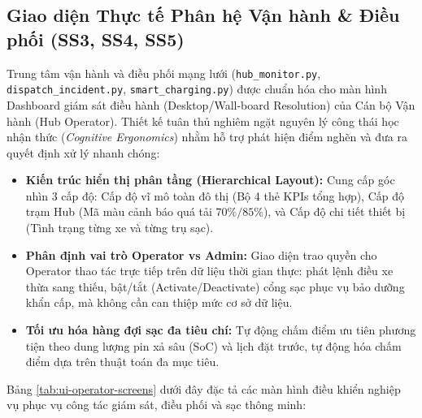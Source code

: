 \documentclass[12pt,a4paper]{article}
\begin{document}
\clearpage
\subsection{Giao diện Thực tế Phân hệ Vận hành \& Điều phối (SS3, SS4, SS5)}
Trung tâm vận hành và điều phối mạng lưới (\texttt{hub\_monitor.py}, \texttt{dispatch\_incident.py}, \texttt{smart\_charging.py}) được chuẩn hóa cho màn hình Dashboard giám sát điều hành (Desktop/Wall-board Resolution) của Cán bộ Vận hành (Hub Operator). Thiết kế tuân thủ nghiêm ngặt nguyên lý công thái học nhận thức (\textit{Cognitive Ergonomics}) nhằm hỗ trợ phát hiện điểm nghẽn và đưa ra quyết định xử lý nhanh chóng:
\begin{itemize}[nosep]
    \item \textbf{Kiến trúc hiển thị phân tầng (Hierarchical Layout):} Cung cấp góc nhìn 3 cấp độ: Cấp độ vĩ mô toàn đô thị (Bộ 4 thẻ KPIs tổng hợp), Cấp độ trạm Hub (Mã màu cảnh báo quá tải $70\%/85\%$), và Cấp độ chi tiết thiết bị (Tình trạng từng xe và từng trụ sạc).
    \item \textbf{Phân định vai trò Operator vs Admin:} Giao diện trao quyền cho Operator thao tác trực tiếp trên dữ liệu thời gian thực: phát lệnh điều xe thừa sang thiếu, bật/tắt (Activate/Deactivate) cổng sạc phục vụ bảo dưỡng khẩn cấp, mà không cần can thiệp mức cơ sở dữ liệu.
    \item \textbf{Tối ưu hóa hàng đợi sạc đa tiêu chí:} Tự động chấm điểm ưu tiên phương tiện theo dung lượng pin xả sâu (SoC) và lịch đặt trước, tự động hóa chấm điểm dựa trên thuật toán đa mục tiêu.
\end{itemize}

Bảng \ref{tab:ui-operator-screens} dưới đây đặc tả các màn hình điều khiển nghiệp vụ phục vụ công tác giám sát, điều phối và sạc thông minh:
\end{document}
